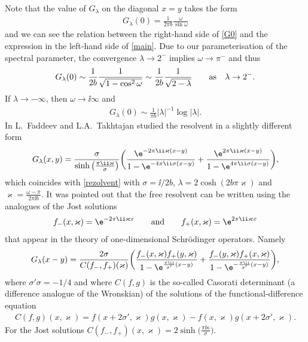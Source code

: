 Note that the value of $G_\lambda$ on the diagonal $x=y$ takes the form
\begin{gather}\label{G0}
G_\lambda(0)=\frac{1}{2\pi b}\frac{\omega}{\sin\omega}
\end{gather}
and we can see the relation between the right-hand side of \eqref{G0} and the expression in the left-hand side of \eqref{main}.
Due to our parameterisation of the spectral parameter, the convergence $\lambda\to 2^-$ implies $\omega\to \pi^-$ and thus
\begin{gather*}
G_\lambda(0) \sim \frac{1}{2b} \frac{1}{\sqrt{1-\cos^2\omega}} \sim \frac{1}{2b} \frac{1}{\sqrt{2-\lambda}}
\qquad {\rm as} \quad \lambda\to 2^-.
\end{gather*}
If $\lambda\to-\infty$, then $\omega \to \ii\infty$ and
\begin{gather*}
G_\lambda(0) \sim \frac{1}{\pi b} |\lambda|^{-1} \log |\lambda|.
\end{gather*}
In \cite{FT2} L.~Faddeev and L.A.~Takhtajan studied the resolvent in a slightly different form
\begin{gather*}
G_\lambda(x,y) = \frac{\sigma}{\sinh \big(\frac{\pi \ii \varkappa}{\sigma}\big) } \bigg( \frac{\e^{-2\pi \ii \varkappa(x-y)}}{1-\e^{- 4 \pi \ii \sigma (x-y)}} +
\frac{\e^{2\pi \ii \varkappa(x-y)}}{1-\e^{4 \pi \ii \sigma (x-y)}} \bigg),
\end{gather*}
which coincides with \eqref{rezolvent} with $\sigma = \ii/2b$, $\lambda = 2\cosh(2b\pi\varkappa)$ and $\varkappa = \frac{\omega - \pi}{2\pi \ii b}$.
It was pointed out that the free resolvent can be written using the analogues of the Jost solutions
\begin{gather*}
f_-(x,\varkappa) = \e^{-2\pi \ii \varkappa x} \qquad {\rm and} \qquad f_+(x,\varkappa) = \e^{2\pi \ii \varkappa x}
\end{gather*}
that appear in the theory of one-dimensional Schr\"odinger operators. Namely
\begin{gather*}
G_\lambda(x-y) = \frac{2\sigma}{C(f_-,f_+)(\varkappa)}
\bigg(\frac{f_-(x, \varkappa) f_+(y, \varkappa)}{1 - \e^{\frac{\pi \ii}{\sigma'} (x-y)}} +
\frac{f_-(y, \varkappa) f_+(x, \varkappa)}{1 - \e^{-\frac{\pi \ii}{\sigma'} (x-y)}} \bigg),
\end{gather*}
where $\sigma' \sigma = -1/4$ and where $C(f,g)$ is the so-called Casorati determinant (a difference analogue of the Wronskian) of the solutions of the functional-difference equation
\begin{gather*}
C(f,g)(x,\varkappa) = f(x+ 2\sigma', \varkappa)g(x,\varkappa) - f(x,\varkappa) g(x + 2\sigma', \varkappa).
\end{gather*}
For the Jost solutions $C(f_-,f_+)(x,\varkappa) = 2\sinh\big(\frac{\pi \ii\kappa}{\sigma}\big)$.

